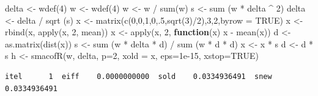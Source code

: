 \documentclass[
  12pt,
  letterpaper,
  DIV=11,
  numbers=noendperiod]{scrreprt}
\newenvironment{Shaded}{\begin{snugshade}}{\end{snugshade}}
\newcommand{\AttributeTok}[1]{\textcolor[rgb]{0.40,0.45,0.13}{#1}}
\newcommand{\ConstantTok}[1]{\textcolor[rgb]{0.56,0.35,0.01}{#1}}
\newcommand{\ControlFlowTok}[1]{\textcolor[rgb]{0.00,0.23,0.31}{\textbf{#1}}}
\newcommand{\DecValTok}[1]{\textcolor[rgb]{0.68,0.00,0.00}{#1}}
\newcommand{\FloatTok}[1]{\textcolor[rgb]{0.68,0.00,0.00}{#1}}
\newcommand{\FunctionTok}[1]{\textcolor[rgb]{0.28,0.35,0.67}{#1}}
\newcommand{\NormalTok}[1]{\textcolor[rgb]{0.00,0.23,0.31}{#1}}
\newcommand{\OtherTok}[1]{\textcolor[rgb]{0.00,0.23,0.31}{#1}}
\newcommand{\SpecialCharTok}[1]{\textcolor[rgb]{0.37,0.37,0.37}{#1}}
\theoremstyle{remark}
\begin{document}
\begin{Shaded}
\begin{Highlighting}[]
\NormalTok{delta }\OtherTok{\textless{}{-}} \FunctionTok{wdef}\NormalTok{(}\DecValTok{4}\NormalTok{)}
\NormalTok{w }\OtherTok{\textless{}{-}} \FunctionTok{wdef}\NormalTok{(}\DecValTok{4}\NormalTok{)}
\NormalTok{w }\OtherTok{\textless{}{-}}\NormalTok{ w }\SpecialCharTok{/} \FunctionTok{sum}\NormalTok{(w)}
\NormalTok{s }\OtherTok{\textless{}{-}} \FunctionTok{sum}\NormalTok{ (w }\SpecialCharTok{*}\NormalTok{ delta }\SpecialCharTok{\^{}} \DecValTok{2}\NormalTok{)}
\NormalTok{delta }\OtherTok{\textless{}{-}}\NormalTok{ delta }\SpecialCharTok{/} \FunctionTok{sqrt}\NormalTok{ (s)}
\NormalTok{x }\OtherTok{\textless{}{-}} \FunctionTok{matrix}\NormalTok{(}\FunctionTok{c}\NormalTok{(}\DecValTok{0}\NormalTok{,}\DecValTok{0}\NormalTok{,}\DecValTok{1}\NormalTok{,}\DecValTok{0}\NormalTok{,.}\DecValTok{5}\NormalTok{,}\FunctionTok{sqrt}\NormalTok{(}\DecValTok{3}\NormalTok{)}\SpecialCharTok{/}\DecValTok{2}\NormalTok{),}\DecValTok{3}\NormalTok{,}\DecValTok{2}\NormalTok{,}\AttributeTok{byrow =} \ConstantTok{TRUE}\NormalTok{)}
\NormalTok{x }\OtherTok{\textless{}{-}} \FunctionTok{rbind}\NormalTok{(x, }\FunctionTok{apply}\NormalTok{(x, }\DecValTok{2}\NormalTok{, mean))}
\NormalTok{x }\OtherTok{\textless{}{-}} \FunctionTok{apply}\NormalTok{(x, }\DecValTok{2}\NormalTok{, }\ControlFlowTok{function}\NormalTok{(x) x }\SpecialCharTok{{-}} \FunctionTok{mean}\NormalTok{(x))}
\NormalTok{d }\OtherTok{\textless{}{-}} \FunctionTok{as.matrix}\NormalTok{(}\FunctionTok{dist}\NormalTok{(x))}
\NormalTok{s }\OtherTok{\textless{}{-}} \FunctionTok{sum}\NormalTok{ (w }\SpecialCharTok{*}\NormalTok{ delta }\SpecialCharTok{*}\NormalTok{ d) }\SpecialCharTok{/} \FunctionTok{sum}\NormalTok{ (w }\SpecialCharTok{*}\NormalTok{ d }\SpecialCharTok{*}\NormalTok{ d)}
\NormalTok{x }\OtherTok{\textless{}{-}}\NormalTok{ x }\SpecialCharTok{*}\NormalTok{ s}
\NormalTok{d }\OtherTok{\textless{}{-}}\NormalTok{ d }\SpecialCharTok{*}\NormalTok{ s}
\NormalTok{h }\OtherTok{\textless{}{-}} \FunctionTok{smacofR}\NormalTok{(w,}
\NormalTok{            delta,}
            \AttributeTok{p=}\DecValTok{2}\NormalTok{,}
            \AttributeTok{xold =}\NormalTok{ x,}
            \AttributeTok{eps=}\FloatTok{1e{-}15}\NormalTok{,}
            \AttributeTok{xstop=}\ConstantTok{TRUE}\NormalTok{)}
\end{Highlighting}
\end{Shaded}

\begin{verbatim}
itel      1  eiff    0.0000000000  sold    0.0334936491  snew    0.0334936491  
\end{verbatim}
\end{document}
